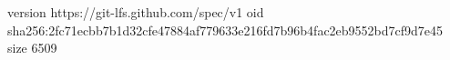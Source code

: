 version https://git-lfs.github.com/spec/v1
oid sha256:2fc71ecbb7b1d32cfe47884af779633e216fd7b96b4fac2eb9552bd7cf9d7e45
size 6509

